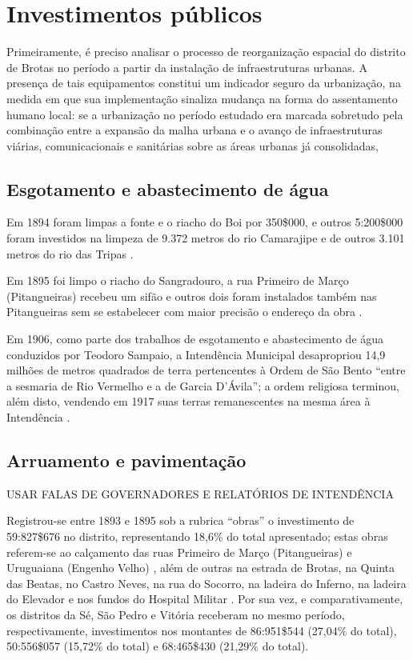 \section{Investimentos públicos}\label{sec:3.1}

Primeiramente, é preciso analisar o processo de reorganização espacial do distrito de Brotas no período a partir da instalação de infraestruturas urbanas. A presença de tais equipamentos constitui um indicador seguro da urbanização, na medida em que sua implementação sinaliza mudança na forma do assentamento humano local: se a urbanização no período estudado era marcada sobretudo pela combinação entre a expansão da malha urbana e o avanço de infraestruturas viárias, comunicacionais e sanitárias sobre as áreas urbanas já consolidadas, 

\subsection{Esgotamento e abastecimento de água}

Em 1894 foram limpas a fonte e o riacho do Boi por 350\$000, e outros 5:200\$000 foram investidos na limpeza de 9.372 metros do rio Camarajipe e de outros 3.101 metros do rio das Tripas \cite[p.~156]{salvador_relatorio_1894}.

Em 1895 foi limpo o riacho do Sangradouro, a rua Primeiro de Março (Pitangueiras) recebeu um sifão e outros dois foram instalados também nas Pitangueiras sem se estabelecer com maior precisão o endereço da obra \cite[pp.~20, 137-138]{salvador_relatorio_1896}. 


Em 1906, como parte dos trabalhos de esgotamento e abastecimento de água conduzidos por Teodoro Sampaio, a Intendência Municipal desapropriou 14,9 milhões de metros quadrados de terra pertencentes à Ordem de São Bento ``entre a sesmaria de Rio Vermelho e a de Garcia D'Ávila''; a ordem religiosa terminou, além disto, vendendo em 1917 suas terras remanescentes na mesma área à Intendência \cite[p.~306]{VASCONCELOS2002}.


\subsection{Arruamento e pavimentação}

USAR FALAS DE GOVERNADORES E RELATÓRIOS DE INTENDÊNCIA

Registrou-se entre 1893 e 1895 sob a rubrica ``obras'' o investimento de 59:827\$676 no distrito, representando 18,6\% do total apresentado;  estas obras referem-se ao calçamento das ruas Primeiro de Março (Pitangueiras) e Uruguaiana (Engenho Velho) \cite[pp.~21-23, 138]{salvador_relatorio_1896}, além de outras na estrada de Brotas, na Quinta das Beatas, no Castro Neves, na rua do Socorro, na ladeira do Inferno, na ladeira do Elevador e nos fundos do Hospital Militar \cite[p.~157]{salvador_relatorio_1894}. Por sua vez, e comparativamente, os distritos da Sé, São Pedro e Vitória receberam no mesmo período, respectivamente, investimentos nos montantes de 86:951\$544 (27,04\% do total), 50:556\$057 (15,72\% do total) e 68:465\$430 (21,29\% do total).

